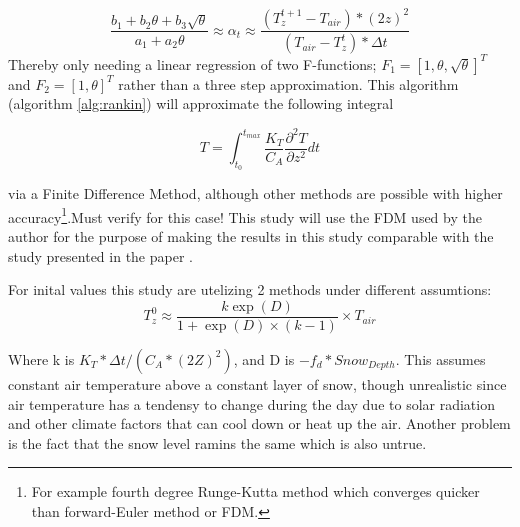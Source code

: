 $$
\frac{b_1 + b_2\theta +b_3\sqrt{\theta}}{a_1 + a_2\theta} \approx \alpha_t \approx \frac{(T_z^{t+1} - T_{air})*(2z)^2}{( T_{air} - T_z^{t})*\Delta t} 
$$
Thereby only needing a linear regression of two F-functions; $F_1 = [ 1,\theta ,\sqrt{\theta} ]^T$ and $F_2 = [1 , \theta]^T$ rather than a three step approximation. This algorithm (algorithm \ref{alg:rankin}) will approximate the following integral

$$
T = \int_{t_0}^{t_{max}} \frac{K_T}{C_A}\frac{\partial^2 T}{\partial z^2} dt
$$

via a Finite Difference Method, although other methods are possible with higher accuracy\footnote{For example fourth degree Runge-Kutta method\cite{runge_ueber_1895} which converges quicker than forward-Euler method or FDM.}.\alert{Must verify for this case!} This study will use the FDM used by the author for the purpose of making the results in this study comparable with the study presented in the paper . 

For inital values this study are utelizing 2 methods under different assumtions:
$$
T_z^0 \approx \frac{k\exp(D)}{1+\exp(D)\times(k-1)}\times T_{air}
$$

Where k is $ K_T*\Delta t/ (C_A * (2Z)^2)$, and D is $-f_d*Snow_{Depth}$. This assumes constant air temperature above a constant layer of snow, though unrealistic since air temperature has a tendensy to change during the day due to solar radiation and other climate factors that can cool down or heat up the air. Another problem is the fact that the snow level ramins the same which is also untrue.